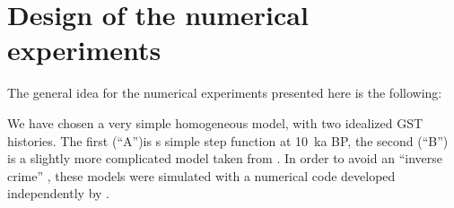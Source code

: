\documentclass[cp]{copernicus}
\begin{document}
% 
% 
% 

\section{Design of the numerical experiments}
\label{sec:design}

The general idea for the numerical experiments presented here is the following:

We have chosen a very simple homogeneous model, with two idealized GST histories. The first 
(``A'')is s simple step function at 10~ka BP, the second (``B'') is a slightly more complicated 
model taken from \cite{Balling1981a}. In order to avoid an ``inverse crime'' 
\cite[see][]{Kaipio2005a}, these models were simulated with a numerical code developed independently 
by \citet{Heckenbach2019a}.
\end{document}
